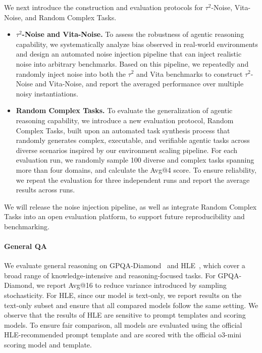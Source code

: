 \documentclass{article}
\begin{document}
We next introduce the construction and evaluation protocols for $\tau^2$-Noise, Vita-Noise, and Random Complex Tasks.
\begin{itemize}
    \item \textbf{$\tau^2$-Noise and Vita-Noise.}
    To assess the robustness of agentic reasoning capability, we systematically analyze bias observed in real-world environments and design an automated noise injection pipeline that can inject realistic noise into arbitrary benchmarks.
    Based on this pipeline, we repeatedly and randomly inject noise into both the $\tau^2$ and Vita benchmarks to construct $\tau^2$-Noise and Vita-Noise, and report the averaged performance over multiple noisy instantiations.

    \item \textbf{Random Complex Tasks.}
    To evaluate the generalization of agentic reasoning capability, we introduce a new evaluation protocol, Random Complex Tasks, built upon an automated task synthesis process that randomly generates complex, executable, and verifiable agentic tasks across diverse scenarios inspired by our environment scaling pipeline.
    For each evaluation run, we randomly sample 100 diverse and complex tasks spanning more than four domains, and calculate the Avg@4 score. 
    To ensure reliability, we repeat the evaluation for three independent runs and report the average results across runs.
    
\end{itemize}
We will release the noise injection pipeline, as well as integrate Random Complex Tasks into an open evaluation platform, to support future reproducibility and benchmarking.

\paragraph{General QA}
We evaluate general reasoning on GPQA-Diamond~\citep{GPQA} and HLE~\citep{HLE}, which cover a broad range of knowledge-intensive and reasoning-focused tasks.
For GPQA-Diamond, we report Avg@16 to reduce variance introduced by sampling stochasticity.
For HLE, since our model is text-only, we report results on the text-only subset and ensure that all compared models follow the same setting.
We observe that the results of HLE are sensitive to prompt templates and scoring models.
To ensure fair comparison, all models are evaluated using the official HLE-recommended prompt template and are scored with the official o3-mini scoring model and template.
\end{document}
